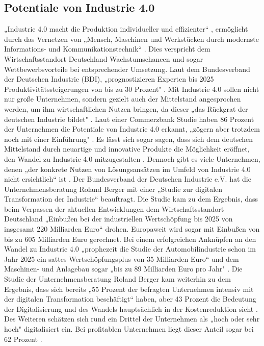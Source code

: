 \subsection{Potentiale von Industrie 4.0}\label{sec:PotentialeIndustrie4.0}
„Industrie 4.0 macht die Produktion individueller und effizienter“ \cite{6}, ermöglicht durch das Vernetzen von „Mensch, Maschinen und Werkstücken durch modernste Informations- und Kommunikationstechnik“ \cite{6}. Dies verspricht dem Wirtschaftsstandort Deutschland Wachstumschancen und sogar Wettbewerbsvorteile bei entsprechender Umsetzung. Laut dem Bundesverband der Deutschen Industrie (BDI), „prognostizieren Experten bis 2025 Produktivitätssteigerungen von bis zu 30 Prozent" \cite{6}.
\newline
Mit Industrie 4.0 sollen nicht nur große Unternehmen, sondern gezielt auch der Mittelstand angesprochen werden, um ihm wirtschaftlichen Nutzen bringen, da dieser „das Rückgrat der deutschen Industrie bildet" \cite[S.4]{2}. Laut einer Commerzbank Studie haben 86 Prozent der Unternehmen die Potentiale von Industrie 4.0 erkannt, „zögern aber trotzdem noch mit einer Einführung" \cite[S.4]{2}. Es lässt sich sogar sagen, dass sich dem deutschen Mittelstand durch neuartige und innovative Produkte die Möglichkeit eröffnet, den Wandel zu Industrie 4.0 mitzugestalten \cite[S.8]{2}. Dennoch gibt es viele Unternehmen, denen „der konkrete Nutzen von Lösungsansätzen im Umfeld von Industrie 4.0 nicht ersichtlich“ ist \cite[S.7]{2}. 
\newline
Der Bundesverband der Deutschen Industrie e.V. hat die Unternehmensberatung Roland Berger mit einer „Studie zur digitalen Transformation der Industrie“ \cite{8} beauftragt. Die Studie kam zu dem Ergebnis, dass beim Verpassen der aktuellen Entwicklungen dem Wirtschaftsstandort Deutschland „Einbußen bei der industriellen Wertschöpfung bis 2025 von insgesamt 220 Milliarden Euro“ \cite{8} drohen. Europaweit wird sogar mit Einbußen von bis zu 605 Milliarden Euro gerechnet. Bei einem erfolgreichen Anknüpfen an den Wandel zu Industrie 4.0 „prophezeit die Studie der Automobilindustrie schon im Jahr 2025 ein sattes Wertschöpfungsplus von 35 Milliarden Euro“ \cite{8} und dem Maschinen- und Anlagebau sogar „bis zu 89 Milliarden Euro pro Jahr" \cite{8}. Die Studie der Unternehmensberatung Roland Berger kam weiterhin zu dem Ergebnis, dass sich bereits „55 Prozent der befragten Unternehmen intensiv mit der digitalen Transformation beschäftigt“ \cite{8} haben, aber 43 Prozent die Bedeutung der Digitalisierung und des Wandels hauptsächlich in der Kostenreduktion sieht \cite{8}. Des Weiteren schätzen sich rund ein Drittel der Unternehmen als „hoch oder sehr hoch" \cite{8} digitalisiert ein. Bei profitablen Unternehmen liegt dieser Anteil sogar bei 62 Prozent \cite{8}.
